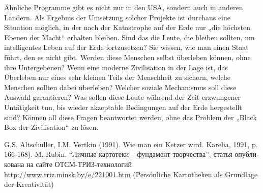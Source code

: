 \documentclass[11pt,a4paper]{article}
\begin{document}
Ähnliche Programme gibt es nicht nur in den USA, sondern auch in anderen
Ländern. Als Ergebnis der Umsetzung solcher Projekte ist durchaus eine
Situation möglich, in der nach der Katastrophe auf der Erde nur „die höchsten
Ebenen der Macht“ erhalten bleiben. Sind das die Leute, die bleiben sollten,
um intelligentes Leben auf der Erde fortzusetzen?  Sie wissen, wie man einen
Staat führt, den es nicht gibt. Werden diese Menschen selbst überleben können,
ohne ihre Untergebenen?  Wenn eine moderne Zivilisation in der Lage ist, das
Überleben nur eines sehr kleinen Teils der Menschheit zu sichern, welche
Menschen sollten dabei überleben?  Welcher soziale Mechanismus soll diese
Auswahl garantieren? Was sollen diese Leute während der Zeit erzwungener
Untätigkeit tun, bis wieder akzeptable Bedingungen auf der Erde hergestellt
sind?  Können all diese Fragen beantwortet werden, ohne das Problem der „Black
Box der Zivilisation“ zu lösen.

\begin{thebibliography}{xxx}
 G.S. Altschuller, I.M. Vertkin (1991). Wie man ein
  Ketzer wird.  Karelia, 1991, p.  166-168).
 M. Rubin. \foreignlanguage{russian}{“Личные картотеки –
  фундамент творчества”, статья опубликована на сайте ОТСМ-ТРИЗ-технологий}
  \url{http://www.triz.minsk.by/e/221001.htm} (Persönliche Kartotheken als
  Grundlage der Kreativität)
\end{thebibliography}
\end{document}
